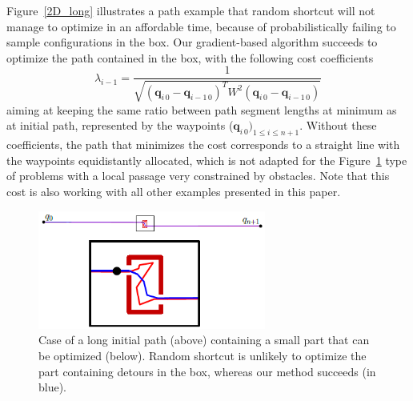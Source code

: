 \documentclass{tADR2e}
\newcommand\conf{\mathbf{q}}
\newcommand\weight{W}
\begin{document}
Figure~\ref{2D_long} illustrates a path example that random shortcut will not manage to 
optimize in an affordable time, because of probabilistically failing to sample 
configurations in the box. Our gradient-based algorithm succeeds to optimize the 
path contained in the box, with the following cost coefficients 
$$
\lambda_{i-1} = \frac{1}{\sqrt{(\conf_{i\,0}-\conf_{i-1\,0})^T \weight^2 
(\conf_{i\,0}-\conf_{i-1\,0})}}
$$
aiming at keeping the same ratio between path segment lengths at 
minimum as at 
initial path, represented by the waypoints ($\conf_{i\,0})_{1\leq i\leq n+1}$.
Without these coefficients, the path that minimizes the cost corresponds to a 
straight line with the waypoints equidistantly allocated, which is not adapted for 
the Figure~\ref{local_box_optim} type of problems with a local passage very
constrained by obstacles. Note that this cost is also working with all other 
examples presented in this paper.


\begin{figure}[t]
	\centering
	\includegraphics[width=7.5cm]{local_box_optim.png}
	\caption{Case of a long initial path (above) containing a small part that can 
	be optimized (below). Random shortcut is unlikely to optimize the part containing detours in the box, whereas our method 
	succeeds (in blue).}
	\label{local_box_optim}
\end{figure}
\end{document}
